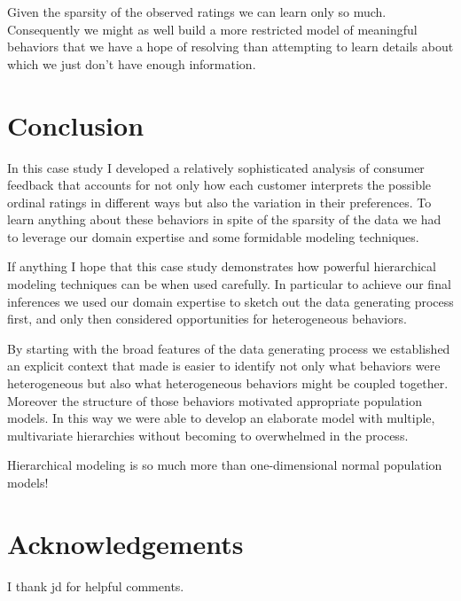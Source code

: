 \documentclass[
  letterpaper,
  DIV=11,
  numbers=noendperiod]{scrartcl}
\begin{document}
Given the sparsity of the observed ratings we can learn only so much.
Consequently we might as well build a more restricted model of
meaningful behaviors that we have a hope of resolving than attempting to
learn details about which we just don't have enough information.

\section{Conclusion}\label{conclusion}

In this case study I developed a relatively sophisticated analysis of
consumer feedback that accounts for not only how each customer
interprets the possible ordinal ratings in different ways but also the
variation in their preferences. To learn anything about these behaviors
in spite of the sparsity of the data we had to leverage our domain
expertise and some formidable modeling techniques.

If anything I hope that this case study demonstrates how powerful
hierarchical modeling techniques can be when used carefully. In
particular to achieve our final inferences we used our domain expertise
to sketch out the data generating process first, and only then
considered opportunities for heterogeneous behaviors.

By starting with the broad features of the data generating process we
established an explicit context that made is easier to identify not only
what behaviors were heterogeneous but also what heterogeneous behaviors
might be coupled together. Moreover the structure of those behaviors
motivated appropriate population models. In this way we were able to
develop an elaborate model with multiple, multivariate hierarchies
without becoming to overwhelmed in the process.

Hierarchical modeling is so much more than one-dimensional normal
population models!

\section*{Acknowledgements}\label{acknowledgements}

I thank jd for helpful comments.
\end{document}

